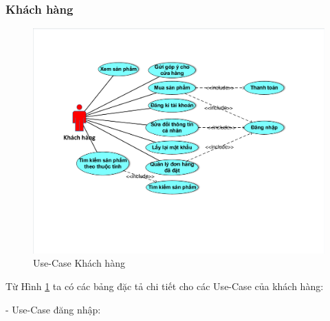 \subsubsection{Khách hàng}
\begin{center}
    \begin{figure}[h]
    \begin{center}
     \includegraphics[scale=0.7]{image/UseCaseTongQuanKH.pdf}
    \end{center}
    \caption{Use-Case Khách hàng}
    \label{refhinh3_3}
    \end{figure}
\end{center}
Từ Hình \ref{refhinh3_3} ta có các bảng đặc tả chi tiết cho các Use-Case của khách hàng:
\par
- Use-Case đăng nhập:
